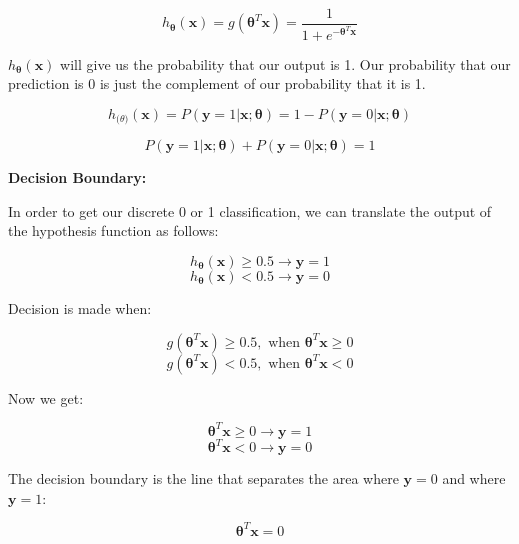 \documentclass{article}
\begin{document}
\[
h_{\boldsymbol{\theta}}(\textbf{x}) 
= g(\boldsymbol{\theta}^T \textbf{x})
= \frac{1}{1 + e^{-\boldsymbol{\theta}^T \textbf{x}}}
\]

\noindent \(h_{\boldsymbol{\theta}}(\textbf{x})\) will give us the probability that our output is 1. Our probability that our prediction is 0 is just the complement of our probability that it is 1.

\[
h_{\boldsymbol(\theta)} (\textbf{x}) 
= P(\textbf{y} = 1 | \textbf{x} ; \boldsymbol{\theta})
= 1 - P(\textbf{y} = 0 | \textbf{x} ; \boldsymbol{\theta})
\]

\[P(\textbf{y} = 1 | \textbf{x} ; \boldsymbol{\theta}) + P(\textbf{y} = 0 | \textbf{x} ; \boldsymbol{\theta}) = 1\]

\noindent \textbf{Decision Boundary:}

\noindent In order to get our discrete 0 or 1 classification, we can translate the output of the hypothesis function as follows:

\[h_{\boldsymbol{\theta}} (\textbf{x}) \geq 0.5 \rightarrow \textbf{y} = 1\]
\[h_{\boldsymbol{\theta}} (\textbf{x}) < 0.5 \rightarrow \textbf{y} = 0\]

\noindent Decision is made when:

\[g(\boldsymbol{\theta}^T \textbf{x}) \geq 0.5, \text{ when } \boldsymbol{\theta}^T \textbf{x} \geq 0\]
\[g(\boldsymbol{\theta}^T \textbf{x}) < 0.5, \text{ when } \boldsymbol{\theta}^T \textbf{x} < 0\]

\noindent Now we get:

\[\boldsymbol{\theta}^T \textbf{x} \geq 0 \rightarrow \textbf{y} = 1\]
\[\boldsymbol{\theta}^T \textbf{x} < 0 \rightarrow \textbf{y} = 0\]

\noindent The decision boundary is the line that separates the area where \(\textbf{y} = 0\) and where \(\textbf{y} = 1\):

\[\boldsymbol{\theta}^T \textbf{x} = 0\]

\printindex
\end{document}
